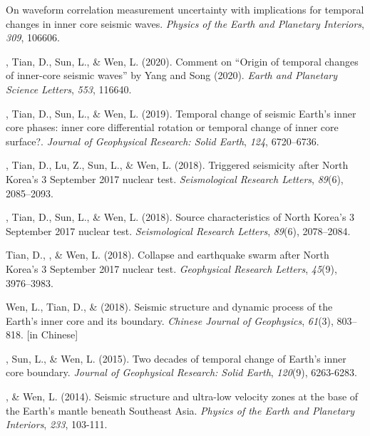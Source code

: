 \begin{etaremune}
    On waveform correlation measurement uncertainty with implications for temporal changes in inner core seismic waves.
    \textit{Physics of the Earth and Planetary Interiors}, \textit{309}, 106606.
\item
    \Yao, Tian, D., Sun, L., \& Wen, L. (2020).
    Comment on “Origin of temporal changes of inner-core seismic waves” by Yang and Song (2020).
    \textit{Earth and Planetary Science Letters}, \textit{553}, 116640.
\item
    \Yao, Tian, D., Sun, L., \& Wen, L. (2019).
    Temporal change of seismic Earth's inner core phases: inner core differential rotation or temporal change of inner core surface?.
    \textit{Journal of Geophysical Research: Solid Earth}, \textit{124}, 6720--6736.
\item
    \Yao, Tian, D., Lu, Z., Sun, L., \& Wen, L. (2018).
    Triggered seismicity after North Korea's 3 September 2017 nuclear test.
    \textit{Seismological Research Letters}, \textit{89}(6), 2085--2093.
\item
    \Yao, Tian, D., Sun, L., \& Wen, L. (2018).
	Source characteristics of North Korea's 3 September 2017 nuclear test.
    \textit{Seismological Research Letters}, \textit{89}(6), 2078--2084.
\item
    Tian, D., \Yao\CF, \& Wen, L. (2018).
    Collapse and earthquake swarm after North Korea's 3 September 2017 nuclear test.
    \textit{Geophysical Research Letters}, \textit{45}(9), 3976--3983.
\item
    Wen, L., Tian, D., \& \Yao (2018).
    Seismic structure and dynamic process of the Earth's inner core and its boundary.
    \textit{Chinese Journal of Geophysics}, \textit{61}(3), 803--818.
     [in Chinese]
\item
    \Yao, Sun, L., \& Wen, L. (2015).
    Two decades of temporal change of Earth's inner core boundary.
    \textit{Journal of Geophysical Research: Solid Earth}, \textit{120}(9), 6263-6283.
\item
    \Yao, \& Wen, L. (2014).
    Seismic structure and ultra-low velocity zones at the base of the Earth's mantle beneath Southeast Asia.
    \textit{Physics of the Earth and Planetary Interiors}, \textit{233}, 103-111.
\end{etaremune}

